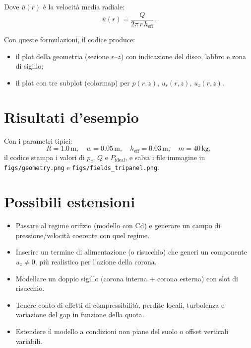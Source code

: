 \documentclass[11pt,a4paper]{article}
\begin{document}
\noindent Dove \(\bar u(r)\) è la velocità media radiale:
\[
\bar u(r) = \frac{Q}{2\pi\,r\,h_{\mathrm{eff}}}.
\]

Con queste formulazioni, il codice produce:
\begin{itemize}
  \item il plot della geometria (sezione \(r\)–\(z\)) con indicazione del disco, labbro e zona di sigillo;
  \item il plot con tre subplot (colormap) per \(p(r,z)\), \(u_r(r,z)\), \(u_z(r,z)\).
\end{itemize}

\section{Risultati d'esempio}
Con i parametri tipici:
\[
R = 1.0\,\text{m}, \quad w = 0.05\,\text{m}, \quad h_{\mathrm{eff}} = 0.03\,\text{m}, \quad m = 40\,\mathrm{kg},
\]
il codice stampa i valori di \(p_c\), \(Q\) e \(P_{\mathrm{ideal}}\), e salva i file immagine in \texttt{figs/geometry.png} e \texttt{figs/fields\_tripanel.png}.

\section{Possibili estensioni}
\begin{itemize}
  \item Passare al regime orifizio (modello con \(\mathrm{Cd}\)) e generare un campo di pressione/velocità coerente con quel regime.
  \item Inserire un termine di alimentazione (o risucchio) che generi un componente \(u_z \neq 0\), più realistico per l'azione della corona.
  \item Modellare un doppio sigillo (corona interna + corona esterna) con slot di risucchio.
  \item Tenere conto di effetti di compressibilità, perdite locali, turbolenza e variazione del gap in funzione della quota.
  \item Estendere il modello a condizioni non piane del suolo o offset verticali variabili.
\end{itemize}
\end{document}
